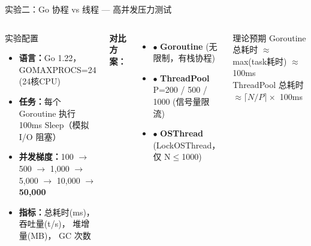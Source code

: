 \begin{frame}{实验二：Go 协程 vs 线程 — 高并发压力测试}
  \begin{columns}[T]
    \begin{block}{实验配置}
      \begin{itemize}
        \item \textbf{语言：}Go 1.22，GOMAXPROCS=24 (24核CPU)
        \item \textbf{任务：}每个 Goroutine 执行 100ms Sleep（模拟 I/O 阻塞）
        \item \textbf{并发梯度：}100 $\rightarrow$ 500 $\rightarrow$ 1,000 $\rightarrow$ 5,000 $\rightarrow$ 10,000 $\rightarrow$ \textbf{50,000}
        \item \textbf{指标：}总耗时(ms)， 吞吐量(t/s)， 堆增量(MB)， GC 次数
      \end{itemize}
    \end{block}

    \textbf{对比方案：}
    \vspace{0.3em}
    \begin{itemize}
      \item {\color{corGreen}$\bullet$} \textbf{Goroutine} (无限制，有栈协程)
      \item {\color{corGold}$\bullet$} \textbf{ThreadPool} P=200 / 500 / 1000 (信号量限流)
      \item {\color{corRed}$\bullet$} \textbf{OSThread} (LockOSThread，仅 N$\leq$1000)
    \end{itemize}

    \vspace{0.5em}
    \begin{exampleblock}{理论预期}
      {\footnotesize Goroutine 总耗时 $\approx$ max(task耗时) $\approx$ 100ms\\
      ThreadPool 总耗时 $\approx \lceil N/P \rceil \times$ 100ms}
    \end{exampleblock}
  \end{columns}
\end{frame}


